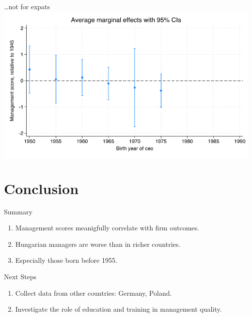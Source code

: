 \documentclass[
  ignorenonframetext,
  aspectratio=1610,
]{beamer}
\providecommand{\tightlist}{%
  \setlength{\itemsep}{0pt}\setlength{\parskip}{0pt}}
\begin{document}
\begin{frame}{\ldots not for expats}
\protect\hypertarget{not-for-expats}{}
\includegraphics{fig/cohort-ceoexpat-marginsplot.png}
\end{frame}

\section{Conclusion}\label{conclusion}

\begin{frame}{Summary}
\protect\hypertarget{summary}{}
\begin{enumerate}
\tightlist
\item
  Management scores meanigfully correlate with firm outcomes.
\item
  Hungarian managers are worse than in richer countries.
\item
  Especially those born before 1955.
\end{enumerate}
\end{frame}

\begin{frame}{Next Steps}
\protect\hypertarget{next-steps}{}
\begin{enumerate}
\tightlist
\item
  Collect data from other countries: Germany, Poland.
\item
  Investigate the role of education and training in management quality.
\end{enumerate}
\end{frame}
\end{document}
